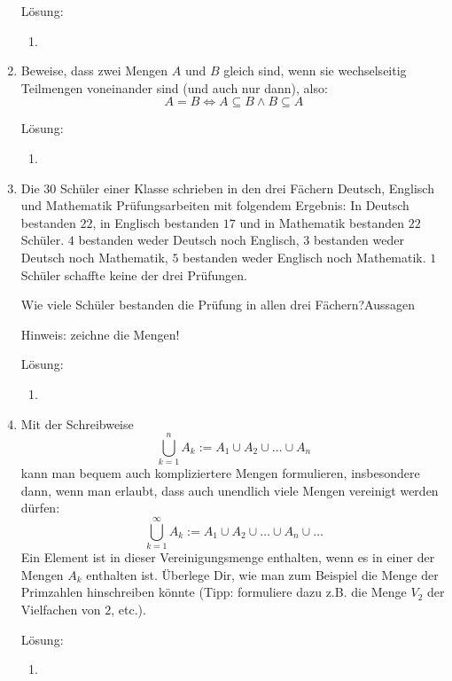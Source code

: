 \documentclass[../main.tex]{subfiles}
\begin{document}
\begin{enumerate}
	      Lösung:
	      \begin{enumerate}
		      \item
	      \end{enumerate}
	\item Beweise, dass zwei Mengen \( A \) und \( B \) gleich sind,
	      wenn sie wechselseitig Teilmengen voneinander sind (und auch nur dann),
	      also:
	      \[ A = B \Leftrightarrow A \subseteq B \land B \subseteq A \]

	      Lösung:
	      \begin{enumerate}
		      \item
	      \end{enumerate}
	\item Die \( 30 \) Schüler einer Klasse schrieben in den drei Fächern
	      Deutsch, Englisch und Mathematik Prüfungsarbeiten mit folgendem Ergebnis:
	      In Deutsch bestanden \( 22 \), in Englisch bestanden \( 17 \)
	      und in Mathematik bestanden \( 22 \) Schüler.
	      \( 4 \) bestanden weder Deutsch noch Englisch,
	      \( 3 \) bestanden weder Deutsch noch Mathematik,
	      \( 5 \) bestanden weder Englisch noch Mathematik.
	      \( 1 \) Schüler schaffte keine der drei Prüfungen.

	      Wie viele Schüler bestanden die Prüfung in allen drei Fächern?Aussagen

	      Hinweis: zeichne die Mengen!

	      Lösung:
	      \begin{enumerate}
		      \item
	      \end{enumerate}
	\item Mit der Schreibweise
	      \[ \bigcup_{k = 1}^{n} A_k := A_1 \cup A_2 \cup \dots \cup A_n \]
	      kann man bequem auch kompliziertere Mengen formulieren, insbesondere dann, wenn man
	      erlaubt, dass auch unendlich viele Mengen vereinigt werden dürfen:
	      \[ \bigcup_{k = 1}^{\infty} A_k := A_1 \cup A_2 \cup \dots \cup A_n \cup \dots \]
	      Ein Element ist in dieser Vereinigungsmenge enthalten, wenn es in einer der Mengen \( A_k \) enthalten ist.
	      Überlege Dir, wie man zum Beispiel die Menge der Primzahlen hinschreiben könnte
	      (Tipp: formuliere dazu z.B. die Menge \( V_2 \) der Vielfachen von \( 2 \), etc.).

	      Lösung:
	      \begin{enumerate}
		      \item
	      \end{enumerate}
\end{enumerate}
\end{document}

